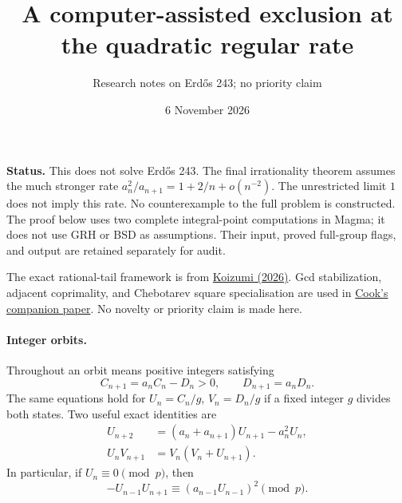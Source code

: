 \documentclass[11pt]{article}
\title{A computer-assisted exclusion at the quadratic regular rate}
\author{Research notes on Erd\H{o}s 243; no priority claim}
\date{6 November 2026}
\begin{document}
\maketitle

\noindent\textbf{Status.} This does not solve Erd\H{o}s 243. The final
irrationality theorem assumes the much stronger rate
$a_n^2/a_{n+1}=1+2/n+o(n^{-2})$. The unrestricted limit $1$ does not
imply this rate. No counterexample to the full problem is constructed.
The proof below uses two complete integral-point computations in Magma;
it does not use GRH or BSD as assumptions. Their input, proved full-group
flags, and output are retained separately for audit.

The exact rational-tail framework is from
\href{https://math.colgate.edu/~integers/aa28/aa28.pdf}{Koizumi (2026)}.
Gcd stabilization, adjacent coprimality, and Chebotarev square
specialisation are used in
\href{https://github.com/wcook04/plectis-erdos/blob/main/paper/243/erdos243-reciprocal-tail-reasoning-surface.tex}{Cook's companion paper}.
No novelty or priority claim is made here.

\paragraph{Integer orbits.}
Throughout an orbit means positive integers satisfying
\begin{equation}\label{eq:orbit}
 C_{n+1}=a_n C_n-D_n>0,\qquad D_{n+1}=a_nD_n.
\end{equation}
The same equations hold for $U_n=C_n/g$, $V_n=D_n/g$ if a fixed
integer $g$ divides both states. Two useful exact identities are
\begin{align}
 U_{n+2}&=(a_n+a_{n+1})U_{n+1}-a_n^2U_n,\label{eq:three}\\
 U_n V_{n+1}&=V_n(V_n+U_{n+1}).\label{eq:quadratic}
\end{align}
In particular, if $U_n\equiv0\pmod p$, then
\begin{equation}\label{eq:neighbours}
 -U_{n-1}U_{n+1}\equiv(a_{n-1}U_{n-1})^2\pmod p.
\end{equation}
\end{document}
